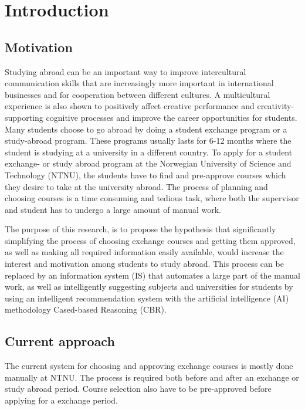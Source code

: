 
\chapter{Introduction}

\section{Motivation}

Studying abroad can be an important way to improve intercultural communication skills that are increasingly more important in international businesses and for cooperation between different cultures.\cite{williams2005exploring} A multicultural experience is also shown to positively affect creative performance and creativity-supporting
cognitive processes\cite{leung2008multicultural} and improve the career opportunities for students\cite{brandenburg2014erasmus}. Many students choose to go abroad by doing a student exchange program or a study-abroad program. These programs usually lasts for 6-12 months where the student is studying at a university in a different country. To apply for a student exchange- or study abroad program at the Norwegian University of Science and Technology (NTNU), the students have to find and pre-approve courses which they desire to take at the university abroad. The process of planning and choosing courses is a time consuming and tedious task, where both the supervisor and student has to undergo a large amount of manual work.

The purpose of this research, is to propose the hypothesis that significantly simplifying the process of choosing exchange courses and getting them approved, as well as making all required information easily available, would increase the interest and motivation among students to study abroad. This process can be replaced by an information system (IS) that automates a large part of the manual work, as well as intelligently suggesting subjects and universities for students by using an intelligent recommendation system with the artificial intelligence (AI) methodology Cased-based Reasoning (CBR).

\section{Current approach}
The current system for choosing and approving exchange courses is mostly done manually at NTNU. The process is required both before and after an exchange or study abroad period. Course selection also have to be pre-approved before applying for a exchange period.

